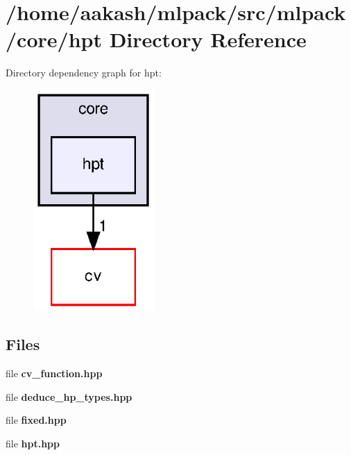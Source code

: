 \section{/home/aakash/mlpack/src/mlpack/core/hpt Directory Reference}
\label{dir_017cea893c7ca6a9a2808f6f628c6dd8}
Directory dependency graph for hpt\+:
\nopagebreak
\begin{figure}[H]
\begin{center}
\leavevmode
\includegraphics[width=130pt]{dir_017cea893c7ca6a9a2808f6f628c6dd8_dep}
\end{center}
\end{figure}
\subsection*{Files}
\begin{DoxyCompactItemize}
\item 
file \textbf{ cv\+\_\+function.\+hpp}
\item 
file \textbf{ deduce\+\_\+hp\+\_\+types.\+hpp}
\item 
file \textbf{ fixed.\+hpp}
\item 
file \textbf{ hpt.\+hpp}
\end{DoxyCompactItemize}
